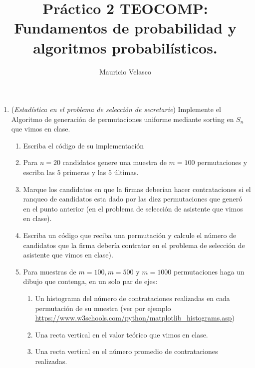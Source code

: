 \documentclass[12pt, a4paper]{article}
\date{}
\begin{document}
\title{Pr\'actico 2 TEOCOMP: Fundamentos de probabilidad y algoritmos probabilísticos.}
\author{Mauricio Velasco}
\maketitle{}


\begin{enumerate}

\item ({\it Estadística en el problema de selección de secretarie}) Implemente el Algoritmo de generación de permutaciones uniforme mediante sorting en $S_n$ que vimos en clase. 
\begin{enumerate}
\item Escriba el código de su implementación
\item Para $n=20$ candidatos genere una muestra de $m=100$ permutaciones y escriba las $5$ primeras y las $5$ últimas.
\item Marque los candidatos en que la firmas deberían hacer contrataciones si el ranqueo de candidatos esta dado por las diez permutaciones que generó en el punto anterior (en el problema de selección de asistente que vimos en clase).

\item Escriba un código que reciba una permutación y calcule el número de candidatos que la firma debería contratar en el problema de selección de asistente que vimos en clase).
\item Para muestras de $m=100,m=500$ y $m=1000$ permutaciones haga un dibujo que contenga, en un solo par de ejes:
\begin{enumerate}
\item Un histograma del número de contrataciones  realizadas en cada permutación de su muestra (ver por ejemplo \url{https://www.w3schools.com/python/matplotlib_histograms.asp})
\item Una recta vertical en el valor teórico que vimos en clase.
\item Una recta vertical en el número promedio de contrataciones realizadas.

\end{enumerate}

\end{enumerate}




\end{enumerate}
\end{document}

